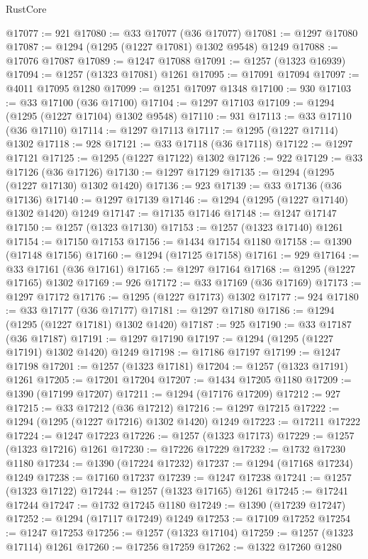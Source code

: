 \begin{lexlean}{RustCore}
\begin{coremodule}
@17077 := 921
@17080 := @33 @17077 (@36 @17077)
@17081 := @1297 @17080
@17087 := @1294 (@1295 (@1227 @17081) @1302 @9548) @1249
@17088 := @17076 @17087
@17089 := @1247 @17088
@17091 := @1257 (@1323 @16939)
@17094 := @1257 (@1323 @17081) @1261
@17095 := @17091 @17094
@17097 := @4011 @17095 @1280
@17099 := @1251 @17097 @1348
@17100 := 930
@17103 := @33 @17100 (@36 @17100)
@17104 := @1297 @17103
@17109 := @1294 (@1295 (@1227 @17104) @1302 @9548)
@17110 := 931
@17113 := @33 @17110 (@36 @17110)
@17114 := @1297 @17113
@17117 := @1295 (@1227 @17114) @1302
@17118 := 928
@17121 := @33 @17118 (@36 @17118)
@17122 := @1297 @17121
@17125 := @1295 (@1227 @17122) @1302
@17126 := 922
@17129 := @33 @17126 (@36 @17126)
@17130 := @1297 @17129
@17135 := @1294 (@1295 (@1227 @17130) @1302 @1420)
@17136 := 923
@17139 := @33 @17136 (@36 @17136)
@17140 := @1297 @17139
@17146 := @1294 (@1295 (@1227 @17140) @1302 @1420) @1249
@17147 := @17135 @17146
@17148 := @1247 @17147
@17150 := @1257 (@1323 @17130)
@17153 := @1257 (@1323 @17140) @1261
@17154 := @17150 @17153
@17156 := @1434 @17154 @1180
@17158 := @1390 (@17148 @17156)
@17160 := @1294 (@17125 @17158)
@17161 := 929
@17164 := @33 @17161 (@36 @17161)
@17165 := @1297 @17164
@17168 := @1295 (@1227 @17165) @1302
@17169 := 926
@17172 := @33 @17169 (@36 @17169)
@17173 := @1297 @17172
@17176 := @1295 (@1227 @17173) @1302
@17177 := 924
@17180 := @33 @17177 (@36 @17177)
@17181 := @1297 @17180
@17186 := @1294 (@1295 (@1227 @17181) @1302 @1420)
@17187 := 925
@17190 := @33 @17187 (@36 @17187)
@17191 := @1297 @17190
@17197 := @1294 (@1295 (@1227 @17191) @1302 @1420) @1249
@17198 := @17186 @17197
@17199 := @1247 @17198
@17201 := @1257 (@1323 @17181)
@17204 := @1257 (@1323 @17191) @1261
@17205 := @17201 @17204
@17207 := @1434 @17205 @1180
@17209 := @1390 (@17199 @17207)
@17211 := @1294 (@17176 @17209)
@17212 := 927
@17215 := @33 @17212 (@36 @17212)
@17216 := @1297 @17215
@17222 := @1294 (@1295 (@1227 @17216) @1302 @1420) @1249
@17223 := @17211 @17222
@17224 := @1247 @17223
@17226 := @1257 (@1323 @17173)
@17229 := @1257 (@1323 @17216) @1261
@17230 := @17226 @17229
@17232 := @1732 @17230 @1180
@17234 := @1390 (@17224 @17232)
@17237 := @1294 (@17168 @17234) @1249
@17238 := @17160 @17237
@17239 := @1247 @17238
@17241 := @1257 (@1323 @17122)
@17244 := @1257 (@1323 @17165) @1261
@17245 := @17241 @17244
@17247 := @1732 @17245 @1180
@17249 := @1390 (@17239 @17247)
@17252 := @1294 (@17117 @17249) @1249
@17253 := @17109 @17252
@17254 := @1247 @17253
@17256 := @1257 (@1323 @17104)
@17259 := @1257 (@1323 @17114) @1261
@17260 := @17256 @17259
@17262 := @1322 @17260 @1280

\end{coremodule}
\end{lexlean}
